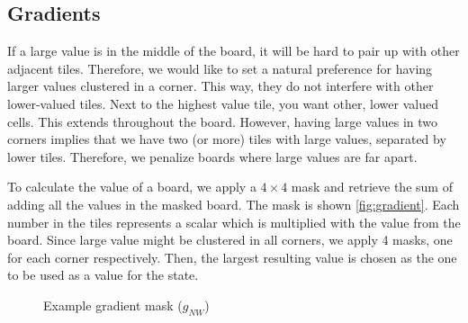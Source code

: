 \documentclass[journal]{IEEEtran}
\begin{document}
\subsection*{Gradients}
If a large value is in the middle of the board, it will be hard to pair up
with other adjacent tiles. Therefore, we would like to set a natural preference
for having larger values clustered in a corner. This way, they do not interfere
with other lower-valued tiles. Next to the highest value tile, you want other,
lower valued cells. This extends throughout the board. However, having large values
in two corners implies that we have two (or more) tiles with large values, separated
by lower tiles. Therefore, we penalize boards where large values are far apart.

To calculate the value of a board, we apply a $4\times{}4$ mask and retrieve the
sum of adding all the values in the masked board.
The mask is shown \autoref{fig:gradient}. Each number in the tiles represents a scalar
which is multiplied with the value from the board. Since large value might be clustered
in all corners, we apply 4 masks, one for each corner respectively. Then,
the largest resulting value is chosen as the one to be used as a value for the state.

\begin{figure}[Hb]
\centering
    \caption{Example gradient mask ($g_{NW}$)}
\label{fig:gradient}
\end{figure}
\end{document}
